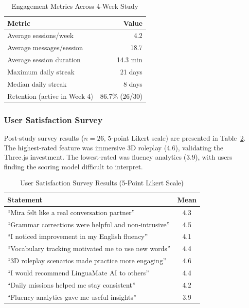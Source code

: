\documentclass[conference]{IEEEtran}
\begin{document}
\begin{table}[htbp]
\caption{Engagement Metrics Across 4-Week Study}
\label{tab:engagement}
\centering
\begin{tabular}{@{}lr@{}}
\toprule
\textbf{Metric} & \textbf{Value} \\
\midrule
Average sessions/week & 4.2 \\
Average messages/session & 18.7 \\
Average session duration & 14.3 min \\
Maximum daily streak & 21 days \\
Median daily streak & 8 days \\
Retention (active in Week 4) & 86.7\% (26/30) \\
\bottomrule
\end{tabular}
\end{table}

\subsubsection{User Satisfaction Survey}
Post-study survey results ($n{=}26$, 5-point Likert scale) are presented in Table~\ref{tab:satisfaction}. The highest-rated feature was immersive 3D roleplay (4.6), validating the Three.js investment. The lowest-rated was fluency analytics (3.9), with users finding the scoring model difficult to interpret.

\begin{table}[htbp]
\caption{User Satisfaction Survey Results (5-Point Likert Scale)}
\label{tab:satisfaction}
\centering
\footnotesize
\begin{tabular}{@{}p{6.0cm}c@{}}
\toprule
\textbf{Statement} & \textbf{Mean} \\
\midrule
``Mira felt like a real conversation partner'' & 4.3 \\
``Grammar corrections were helpful and non-intrusive'' & 4.5 \\
``I noticed improvement in my English fluency'' & 4.1 \\
``Vocabulary tracking motivated me to use new words'' & 4.4 \\
``3D roleplay scenarios made practice more engaging'' & 4.6 \\
``I would recommend LinguaMate AI to others'' & 4.4 \\
``Daily missions helped me stay consistent'' & 4.2 \\
``Fluency analytics gave me useful insights'' & 3.9 \\
\bottomrule
\end{tabular}
\end{table}
\end{document}

